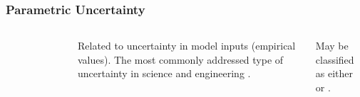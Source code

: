 \begin{frame}
    \frametitle{Parametric Uncertainty}

    \begin{columns}
        \column[t]{4cm}
        \begin{figure}
            \centering
        \end{figure}

        \column[t]{6cm}
        \begin{definition}
            Related to uncertainty in model inputs (empirical values). The most commonly
            addressed type of uncertainty in science and engineering 
            \cite{yue_review_2018,decarolis_using_2011,morgan_uncertainty_1990}.    
        \end{definition}
        
        May be classified as either  or 
         \cite{pfenninger_energy_2014,kiureghian_aleatory_2009}. 
    \end{columns}

\end{frame}

